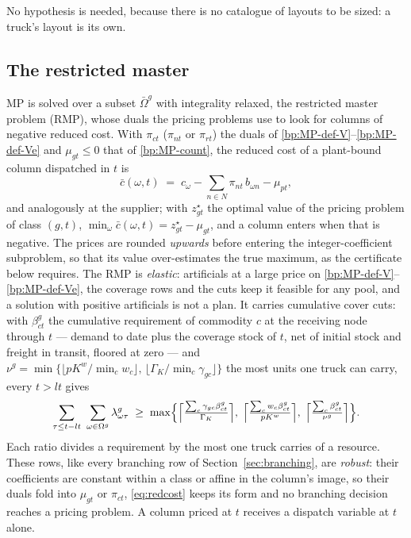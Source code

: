 \noindent No hypothesis is needed, because there is no catalogue of
layouts to be sized: a truck's layout is its own.

\subsection{The restricted master}
\label{sec:rmp}

MP is solved over a subset $\bar\Omega^{g}$ with integrality relaxed,
the restricted master problem (RMP), whose duals the pricing problems
use to look for columns of negative reduced cost. With
$\pi_{ct}$ ($\pi_{nt}$ or $\pi_{rt}$) the duals of
\eqref{bp:MP-def-V}--\eqref{bp:MP-def-Ve} and $\mu_{gt}\le0$ that of
\eqref{bp:MP-count}, the reduced cost of a plant-bound column
dispatched in $t$ is
\begin{equation}
\bar c(\omega,t)\;=\;c_{\omega}-\sum_{n\in N}\pi_{nt}\,b_{\omega n}
                              -\mu_{pt},
\label{eq:redcost}
\end{equation}
and analogously at the supplier; with $z^{\star}_{gt}$ the optimal
value of the pricing problem of class $(g,t)$,
$\min_{\omega}\bar c(\omega,t)=z^{\star}_{gt}-\mu_{gt}$, and a column
enters when that is negative. The prices are rounded \emph{upwards}
before entering the integer-coefficient subproblem, so that its value
over-estimates the true maximum, as the certificate below requires. The
RMP is \emph{elastic}: artificials at a large price on
\eqref{bp:MP-def-V}--\eqref{bp:MP-def-Ve}, the coverage rows and the
cuts keep it feasible for any pool, and a solution with positive
artificials is not a plan. It carries cumulative cover cuts: with
$\beta^{g}_{ct}$ the cumulative requirement of commodity $c$ at the
receiving node through $t$ --- demand to date plus the coverage stock
of $t$, net of initial stock and freight in transit, floored at zero
--- and
$\nu^{g}=\min\{\lfloor pK^{w}/\min_{c}w_{c}\rfloor,\,
\lfloor\Gamma_{K}/\min_{c}\gamma_{gc}\rfloor\}$ the most units one truck
can carry, every $t>lt$ gives
\begin{equation}
\sum_{\tau\le t-lt}\ \sum_{\omega\in\Omega^{g}}\lambda^{g}_{\omega\tau}
\;\ge\;
\max\Bigl\{\Bigl\lceil\tfrac{\sum_{c}\gamma_{gc}\beta^{g}_{ct}}{\Gamma_{K}}\Bigr\rceil,\;
\Bigl\lceil\tfrac{\sum_{c}w_{c}\beta^{g}_{ct}}{pK^{w}}\Bigr\rceil,\;
\Bigl\lceil\tfrac{\sum_{c}\beta^{g}_{ct}}{\nu^{g}}\Bigr\rceil\Bigr\}.
\label{eq:covercut}
\end{equation}
Each ratio divides a requirement by the most one truck carries of a
resource. These rows, like every branching row of
Section~\ref{sec:branching}, are \emph{robust}: their coefficients are
constant within a class or affine in the column's image, so their duals
fold into $\mu_{gt}$ or $\pi_{ct}$, \eqref{eq:redcost} keeps its form
and no branching decision reaches a pricing problem. A column priced at $t$
receives a dispatch variable at $t$ alone.

